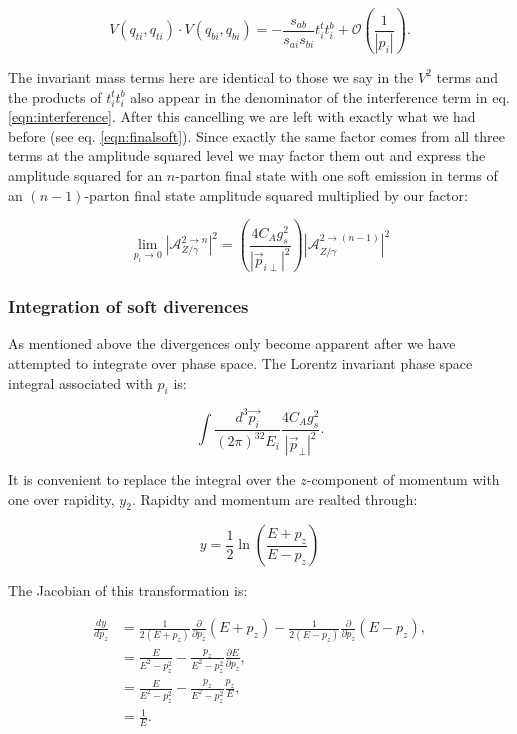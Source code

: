 			\begin{equation}
				V(q_{ti}, q_{ti})\cdot V(q_{bi}, q_{bi}) = -\frac{s_{ab}}{s_{ai}s_{bi}}t_i^tt_i^b +
					\mathcal{O}\left(\frac{1}{|p_i|}\right).
			\end{equation}

			The invariant mass terms here are identical to those we say in the $V^2$ terms and the products of
			$t_i^tt_i^b$ also appear in the denominator of the interference term in eq. \eqref{eqn:interference}.
			After this cancelling we are left with exactly what we had before (see eq. \eqref{eqn:finalsoft}).
			Since exactly the same factor comes from all three terms at the amplitude squared level we may factor
			them out and express the amplitude squared for an $n$-parton final state with one soft emission in
			terms of an $(n-1)$-parton final state amplitude squared multiplied by our factor:

			\begin{equation}
				\lim_{p_i\rightarrow0} |\mathcal{A}_{Z/\gamma}^{2\rightarrow n}|^2 = \left(\frac{4C_Ag_s^2}{|\vec{p}_{i\perp}|^2}\right)
					|\mathcal{A}_{Z/\gamma}^{2\rightarrow (n-1)}|^2
			\end{equation}

		\subsubsection{Integration of soft diverences}
			\label{sub:subsection_name}

			As mentioned above the divergences only become apparent after we have attempted to integrate over
			phase space.  The Lorentz invariant phase space integral associated with $p_i$ is:

			\begin{equation}
				\int\frac{d^3\vec{p_i}}{(2\pi)^32E_i}\frac{4C_Ag_s^2}{|\vec{p}_\perp|^2}.
			\end{equation}

			It is convenient to replace the integral over the $z$-component of momentum with one over rapidity,
			$y_2$.  Rapidty and momentum are realted through:

			\begin{equation}
				y = \frac12\ln\left(\frac{E + p_z}{E - p_z}\right)
			\end{equation}

			The Jacobian of this transformation is:

			\begin{align}
				\frac{dy}{dp_z} &= \frac{1}{2(E+p_z)} \frac{\partial}{\partial p_z}(E+p_z) - \frac{1}{2(E-p_z)}\frac{\partial}{\partial p_z}(E-p_z),\\
				&= \frac{E}{E^2-p_z^2} - \frac{p_z}{E^2-p_z^2}\frac{\partial E}{\partial p_z},\\
				&= \frac{E}{E^2-p_z^2} - \frac{p_z}{E^2-p_z^2}\frac{p_z}{E},\\
				&= \frac{1}{E}.
			\end{align}

